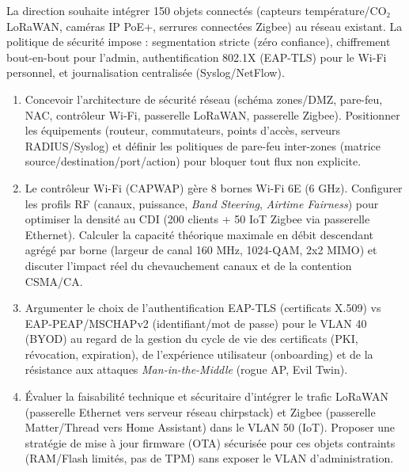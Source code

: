\documentclass[11pt]{article}
\begin{document}
\begin{exercice}
La direction souhaite intégrer 150 objets connectés (capteurs température/CO₂ LoRaWAN, caméras IP PoE+, serrures connectées Zigbee) au réseau existant. La politique de sécurité impose : segmentation stricte (zéro confiance), chiffrement bout-en-bout pour l'admin, authentification 802.1X (EAP-TLS) pour le Wi-Fi personnel, et journalisation centralisée (Syslog/NetFlow).
\begin{enumerate}
    \item Concevoir l'architecture de sécurité réseau (schéma zones/DMZ, pare-feu, NAC, contrôleur Wi-Fi, passerelle LoRaWAN, passerelle Zigbee). Positionner les équipements (routeur, commutateurs, points d'accès, serveurs RADIUS/Syslog) et définir les politiques de pare-feu inter-zones (matrice source/destination/port/action) pour bloquer tout flux non explicite.
    \item Le contrôleur Wi-Fi (CAPWAP) gère 8 bornes Wi-Fi 6E (6 GHz). Configurer les profils RF (canaux, puissance, \textit{Band Steering}, \textit{Airtime Fairness}) pour optimiser la densité au CDI (200 clients + 50 IoT Zigbee via passerelle Ethernet). Calculer la capacité théorique maximale en débit descendant agrégé par borne (largeur de canal 160 MHz, 1024-QAM, 2x2 MIMO) et discuter l'impact réel du chevauchement canaux et de la contention CSMA/CA.
    \item Argumenter le choix de l'authentification EAP-TLS (certificats X.509) vs EAP-PEAP/MSCHAPv2 (identifiant/mot de passe) pour le VLAN 40 (BYOD) au regard de la gestion du cycle de vie des certificats (PKI, révocation, expiration), de l'expérience utilisateur (onboarding) et de la résistance aux attaques \textit{Man-in-the-Middle} (rogue AP, Evil Twin).
    \item Évaluer la faisabilité technique et sécuritaire d'intégrer le trafic LoRaWAN (passerelle Ethernet vers serveur réseau chirpstack) et Zigbee (passerelle Matter/Thread vers Home Assistant) dans le VLAN 50 (IoT). Proposer une stratégie de mise à jour firmware (OTA) sécurisée pour ces objets contraints (RAM/Flash limités, pas de TPM) sans exposer le VLAN d'administration.
\end{enumerate}
\end{exercice}
\end{document}
